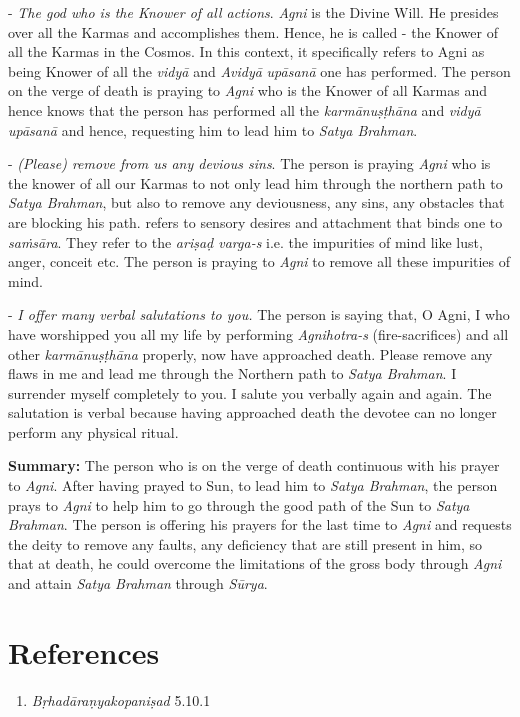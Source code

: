 - \emph{The god who is the Knower of all actions}. \emph{Agni} is the Divine Will. He presides over all the Karmas and accomplishes them. Hence, he is called - the Knower of all the Karmas in the Cosmos. In this context, it specifically refers to Agni as being Knower of all the \emph{vidyā} and \emph{Avidyā} \emph{upāsanā} one has performed. The person on the verge of death is praying to \emph{Agni} who is the Knower of all Karmas and hence knows that the person has performed all the \emph{karmānuṣṭhāna} and \emph{vidyā} \emph{upāsanā} and hence, requesting him to lead him to \emph{Satya Brahman}.

- \emph{(Please) remove from us any devious sins}. The person is praying \emph{Agni} who is the knower of all our Karmas to not only lead him through the northern path to \emph{Satya Brahman}, but also to remove any deviousness, any sins, any obstacles that are blocking his path.  refers to sensory desires and attachment that binds one to \emph{saṁsāra}. They refer to the \emph{ariṣaḍ varga-s} i.e. the impurities of mind like lust, anger, conceit etc. The person is praying to \emph{Agni} to remove all these impurities of mind.

- \emph{I offer many verbal salutations to you.} The person is saying that, O Agni, I who have worshipped you all my life by performing \emph{Agnihotra-s} (fire-sacrifices) and all other \emph{karmānuṣṭhāna} properly, now have approached death. Please remove any flaws in me and lead me through the Northern path to \emph{Satya Brahman}. I surrender myself completely to you. I salute you verbally again and again. The salutation is verbal because having approached death the devotee can no longer perform any physical ritual.

\textbf{Summary:} The person who is on the verge of death continuous with his prayer to \emph{Agni}. After having prayed to Sun, to lead him to \emph{Satya Brahman}, the person prays to \emph{Agni} to help him to go through the good path of the Sun to \emph{Satya Brahman}. The person is offering his prayers for the last time to \emph{Agni} and requests the deity to remove any faults, any deficiency that are still present in him, so that at death, he could overcome the limitations of the gross body through \emph{Agni} and attain \emph{Satya Brahman} through \emph{Sūrya}.

\section*{References}

\begin{enumerate}
\itemsep=0pt
\item
  \emph{Bṛhadāraṇyakopaniṣad} 5.10.1
\end{enumerate}


